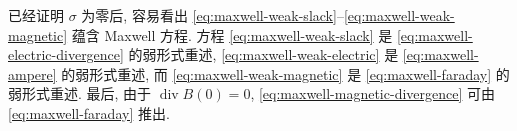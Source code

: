 已经证明 $\sigma$ 为零后, 容易看出 \eqref{eq:maxwell-weak-slack}--\eqref{eq:maxwell-weak-magnetic} 蕴含 Maxwell 方程. 方程 \eqref{eq:maxwell-weak-slack} 是 \eqref{eq:maxwell-electric-divergence} 的弱形式重述, \eqref{eq:maxwell-weak-electric} 是 \eqref{eq:maxwell-ampere} 的弱形式重述, 而 \eqref{eq:maxwell-weak-magnetic} 是 \eqref{eq:maxwell-faraday} 的弱形式重述. 最后, 由于 $\operatorname{div}B(0)=0$, \eqref{eq:maxwell-magnetic-divergence} 可由 \eqref{eq:maxwell-faraday} 推出.
